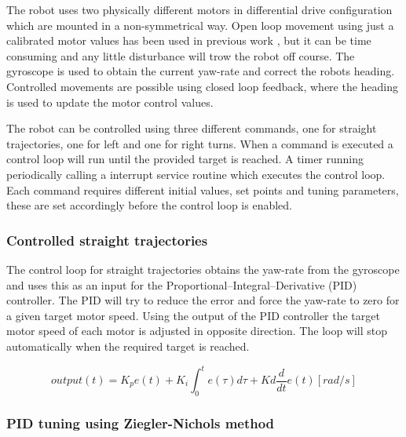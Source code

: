 The robot uses two physically different motors in differential drive configuration which are mounted in a non-symmetrical way.
Open loop movement using just a calibrated motor values has been used in previous work \cite{legoc_uist_2016}, but it can be time consuming and any little disturbance will trow the robot off course.
The gyroscope is used to obtain the current yaw-rate and correct the robots heading.
Controlled movements are possible using closed loop feedback, where the heading is used to update the motor control values.

The robot can be controlled using three different commands, one for straight trajectories, one for left and one for right turns.
When a command is executed a control loop will run until the provided target is reached.
A timer running periodically calling a interrupt service routine which executes the control loop.   
Each command requires different initial values, set points and tuning parameters, these are set accordingly before the control loop is enabled.

\subsubsection{Controlled straight trajectories}


The control loop for straight trajectories obtains the yaw-rate from the gyroscope and uses this as an input for the Proportional–Integral–Derivative (PID) controller.
The PID will try to reduce the error and force the yaw-rate to zero for a given target motor speed.
Using the output of the PID controller the target motor speed of each motor is adjusted in opposite direction.
The loop will stop automatically when the required target is reached.

\begin{equation}
output(t) = K_{p}e(t) + K_{i} \int_{0}^{t}e(\tau)d\tau + Kd\frac{d}{dt}e(t) [rad/s]
\end{equation}

\subsubsection{PID tuning using Ziegler-Nichols method}

